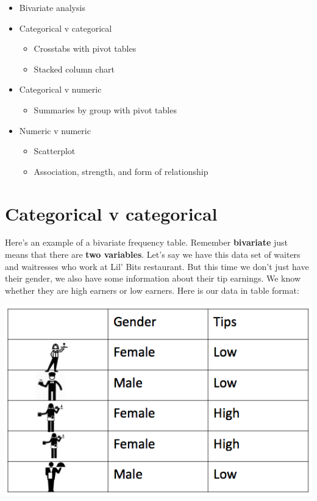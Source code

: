 \documentclass[]{book}
\providecommand{\tightlist}{%
  \setlength{\itemsep}{0pt}\setlength{\parskip}{0pt}}
\theoremstyle{definition}
\theoremstyle{definition}
\theoremstyle{definition}
\theoremstyle{remark}
\begin{document}
\begin{itemize}
\tightlist
\item
  Bivariate analysis
\item
  Categorical v categorical

  \begin{itemize}
  \tightlist
  \item
    Crosstabs with pivot tables
  \item
    Stacked column chart
  \end{itemize}
\item
  Categorical v numeric

  \begin{itemize}
  \tightlist
  \item
    Summaries by group with pivot tables
  \end{itemize}
\item
  Numeric v numeric

  \begin{itemize}
  \tightlist
  \item
    Scatterplot
  \item
    Association, strength, and form of relationship
  \end{itemize}
\end{itemize}

\hypertarget{categorical-v-categorical}{%
\section{Categorical v categorical}\label{categorical-v-categorical}}

Here's an example of a bivariate frequency table. Remember
\textbf{bivariate} just means that there are \textbf{two variables}.
Let's say we have this data set of waiters and waitresses who work at
Lil' Bits restaurant. But this time we don't just have their gender, we
also have some information about their tip earnings. We know whether
they are high earners or low earners. Here is our data in table format:

\includegraphics{imgs/waiter_height_and_tip.png}
\end{document}
